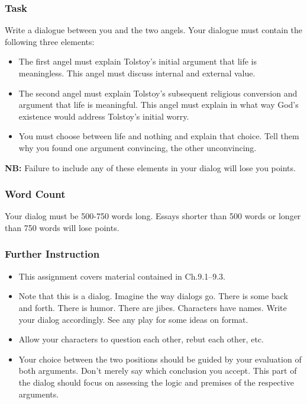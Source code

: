 \documentclass[]{article}
\begin{document}
\subsubsection{Task}\label{task}

Write a dialogue between you and the two angels. Your dialogue must
contain the following three elements:

\begin{itemize}
\itemsep1pt\parskip0pt
\item
  The first angel must explain Tolstoy's initial argument that life is
  meaningless. This angel must discuss internal and external value.
\item
  The second angel must explain Tolstoy's subsequent religious
  conversion and argument that life is meaningful. This angel must
  explain in what way God's existence would address Tolstoy's initial
  worry.
\item
  You must choose between life and nothing and explain that choice. Tell
  them why you found one argument convincing, the other unconvincing.
\end{itemize}

\textbf{NB:} Failure to include any of these elements in your dialog
will lose you points.

\subsubsection{Word Count}\label{word-count}

Your dialog must be 500-750 words long. Essays shorter than 500 words or
longer than 750 words will lose points.

\subsubsection{Further Instruction}\label{further-instruction}

\begin{itemize}
\itemsep1pt\parskip0pt
\item
  This assignment covers material contained in Ch.9.1--9.3.
\item
  Note that this is a dialog. Imagine the way dialogs go. There is some
  back and forth. There is humor. There are jibes. Characters have
  names. Write your dialog accordingly. See any play for some ideas on
  format.
\item
  Allow your characters to question each other, rebut each other, etc.
\item
  Your choice between the two positions should be guided by your
  evaluation of both arguments. Don't merely say which conclusion you
  accept. This part of the dialog should focus on assessing the logic
  and premises of the respective arguments.
\end{itemize}
\end{document}

